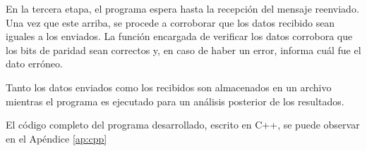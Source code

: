 	En la tercera etapa, el programa espera hasta la recepción del mensaje reenviado. Una vez que este arriba, se procede a corroborar que los datos recibido sean iguales a los enviados.	La función encargada de verificar los datos corrobora que los bits de paridad sean correctos y, en caso de haber un error, informa cuál fue el dato erróneo.
	
	Tanto los datos enviados como los recibidos son almacenados en un archivo mientras el programa es ejecutado para un análisis posterior de los resultados.
	
	El código completo del programa desarrollado, escrito en C++, se puede observar en el Apéndice \ref{ap:cpp}
%	
%		
%	
